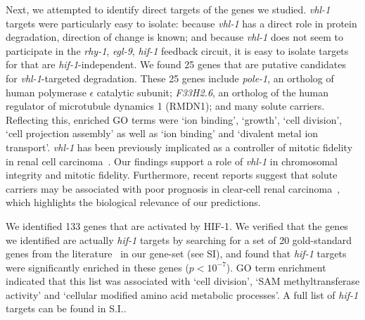 \documentclass[9pt,twocolumn,twoside]{pnas-new}
\newcommand{\egl}{\emph{egl-9}}
\newcommand{\rhy}{\emph{rhy-1}}
\newcommand{\vhl}{\emph{vhl-1}}
\newcommand{\hif}{\emph{hif-1}}
\newcommand{\hifp}{HIF-1}
\newcommand{\hiftargets}{133}
\begin{document}
Next, we attempted to identify direct targets of the genes we studied. \vhl{} targets were particularly easy to isolate: because \vhl{} has a direct role in protein degradation, direction of change is known; and because \vhl{} does not seem to participate in the \rhy{}, \egl{}, \hif{} feedback circuit, it is easy to isolate targets for that are \hif{}-independent. We found 25 genes that are putative candidates for \vhl{}-targeted degradation. These 25 genes include \emph{pole-1}, an ortholog of human polymerase $\epsilon$ catalytic subunit; \emph{F33H2.6}, an ortholog of the human regulator of microtubule dynamics 1 (RMDN1); and many solute carriers.
Reflecting this, enriched GO terms were `ion binding', `growth', `cell division', `cell projection assembly' as well as `ion binding' and `divalent metal ion transport'. \vhl{} has been previously implicated as a controller of mitotic fidelity in renal cell carcinoma~\cite{Hell2014}. Our findings support a role of \vhl{} in chromosomal integrity and mitotic fidelity. Furthermore, recent reports suggest that solute carriers may be associated with poor prognosis in clear-cell renal carcinoma~\cite{Liu2015}, which highlights the biological relevance of our predictions.

We identified \hiftargets{} genes that are activated by \hifp{}. We verified that the genes we identified are actually \hif{} targets by searching for a set of 20 gold-standard genes from the literature~\cite{} in our gene-set (see SI), and found that \hif{} targets were significantly enriched in these genes ($p<10^{-7}$). GO term enrichment indicated that this list was associated with `cell division', `SAM methyltransferase activity' and `cellular modified amino acid metabolic processes'. A full list of \hif{} targets can be found in S.I..
\end{document}

